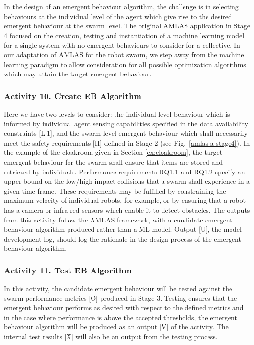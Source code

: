 \documentclass[lettersize,journal]{IEEEtran}
\begin{document}
In the design of an emergent behaviour algorithm, the challenge is in selecting behaviours at the individual level of the agent which give rise to the desired emergent behaviour at the swarm level. The original AMLAS application in Stage 4 focused on the creation, testing and instantiation of a machine learning model for a single system with no emergent behaviours to consider for a collective. In our adaptation of AMLAS for the robot swarm,  we step away from the machine learning paradigm to allow consideration for all possible optimization algorithms which may attain the target emergent behaviour.

\subsubsection*{Activity 10. Create EB Algorithm}

Here we have two levels to consider: the individual level behaviour which is informed by individual agent sensing capabilities specified in the data availability constraints [L.1], and the swarm level emergent behaviour which shall necessarily meet the safety requirements [H] defined in Stage 2 (see Fig.~\ref{amlas-a-stage4}). In the example of the cloakroom given in Section \ref{ex:cloakroom}, the target emergent behaviour for the swarm shall ensure that items are stored and retrieved by individuals. Performance requirements RQ1.1 and RQ1.2 specify an upper bound on the low/high impact collisions that a swarm shall experience in a given time frame. These requirements may be fulfilled by constraining the maximum velocity of individual robots, for example, or by ensuring that a robot has a camera or infra-red sensors which enable it to detect obstacles. The outputs from this activity follow the AMLAS framework, with a candidate emergent behaviour algorithm produced rather than a ML model. Output [U], the model development log, should log the rationale in the design process of the emergent behaviour algorithm.

\subsubsection*{Activity 11. Test EB Algorithm}

In this activity, the candidate emergent behaviour will be tested against the swarm performance metrics [O] produced in Stage 3. Testing ensures that the emergent behaviour performs as desired with respect to the defined metrics and in the case where performance is above the accepted thresholds, the emergent behaviour algorithm will be produced as an output [V] of the activity. The internal test results [X] will also be an output from the testing process.
\end{document}
